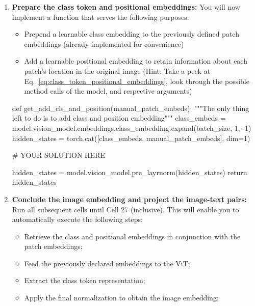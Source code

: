 \begin{exercise}
\begin{enumerate}
\begin{itemize}
        \item Compare your results with the original implementation to assure correctness (this will allow you to test if you implemented the previous function as intended).
    \end{itemize}

    \item \textbf{Prepare the class token and positional embeddings:} You will now implement a function that serves the following purposes:
    \begin{itemize}
        \item Prepend a learnable class embedding to the previously defined patch embeddings (already implemented for convenience)

        \item Add a learnable positional embedding to retain information about each patch's location in the original image (Hint: Take a peek at Eq.~\ref{eq:class_token_positional_embeddings}, look through the possible method calls of the model, and respective arguments)
    \end{itemize}
    \begin{python}
def get_add_cls_and_position(manual_patch_embeds):
    """The only thing left to do is to add class and position embedding"""
    class_embeds = model.vision_model.embeddings.class_embedding.expand(batch_size, 1, -1)
    hidden_states = torch.cat([class_embeds, manual_patch_embeds], dim=1)
    
    # YOUR SOLUTION HERE
    
    hidden_states = model.vision_model.pre_layrnorm(hidden_states)
    return hidden_states
    \end{python}

    \item \textbf{Conclude the image embedding and project the image-text pairs:} Run all subsequent cells until Cell 27 (inclusive). This will enable you to automatically execute the following steps:
    \begin{itemize}
        \item Retrieve the class and positional embeddings in conjunction with the patch embeddings;

        \item Feed the previously declared embeddings to the ViT;

        \item Extract the class token representation;
        
        \item Apply the final normalization to obtain the image embedding;


\end{itemize}
\end{enumerate}
\end{exercise}
